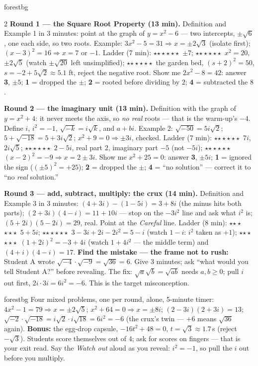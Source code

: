 \documentclass[10pt]{article}
\newcommand{\rung}[1]{{\color{goldacc}\ifcase#1\or$\star$\or$\star\star$\or$\star\star\star$\fi}}
\begin{document}
\begin{skillbox}{forestbg}
\begin{multicols}{2}
\textbf{Round 1 --- the Square Root Property (13 min).} Definition and Example 1 in 3 minutes:
point at the graph of $y=x^2-6$ --- two intercepts, $\pm\sqrt6$, one each side, so two roots.
Example: $3x^2-5=31\Rightarrow x=\pm2\sqrt3$ (isolate first); $(x-3)^2=16\Rightarrow x=7$ or
$-1$. Ladder (7 min): \rung1\ $\pm7$; \rung2\ $x^2=20$, $\pm2\sqrt5$ (watch $\pm\sqrt{20}$ left
unsimplified); \rung3\ the garden bed, $(s+2)^2=50$, $s=-2+5\sqrt2\approx5.1$ ft, reject the
negative root. Show me $2x^2-8=42$: answer \textbf{3}, $\pm5$; \textbf{1} = dropped the $\pm$;
\textbf{2} = rooted before dividing by $2$; \textbf{4} = subtracted the $8$.

\textbf{Round 2 --- the imaginary unit (13 min).} Definition with the graph of $y=x^2+4$:
it never meets the axis, so \emph{no real} roots --- that is the warm-up's $-4$. Define $i$,
$i^2=-1$, $\sqrt{-k}=i\sqrt k$, and $a+bi$. Example 2: $\sqrt{-50}=5i\sqrt2$;
$5+\sqrt{-18}=5+3i\sqrt2$; $x^2+9=0\Rightarrow\pm3i$, checked. Ladder (7 min): \rung1\ $7i$,
$2i\sqrt5$; \rung2\ $2-5i$, real part $2$, imaginary part $-5$ (not $-5i$); \rung3\
$(x-2)^2=-9\Rightarrow x=2\pm3i$. Show me $x^2+25=0$: answer \textbf{3}, $\pm5i$; \textbf{1} =
ignored the sign ($(\pm5)^2=+25$); \textbf{2} = dropped the $\pm$; \textbf{4} = ``no solution''
--- correct it to ``no \emph{real} solution.''

\columnbreak
\textbf{Round 3 --- add, subtract, multiply: the crux (14 min).} Definition and Example 3 in 3
minutes: $(4+3i)-(1-5i)=3+8i$ (the minus hits both parts); $(2+3i)(4-i)=11+10i$ --- stop on the
$-3i^2$ line and ask what $i^2$ is; $(5+2i)(5-2i)=29$, real. Point at the \emph{Careful} line.
Ladder (8 min): \rung1\ $5+5i$; \rung2\ $3-3i+2i-2i^2=5-i$ (watch $1-i$: $i^2$ taken as $+1$);
\rung3\ $(1+2i)^2=-3+4i$ (watch $1+4i^2$ --- the middle term) and $(4+i)(4-i)=17$.
\textbf{Find the mistake --- the frame not to rush:} Student A wrote
$\sqrt{-4}\cdot\sqrt{-9}=\sqrt{36}=6$. Give 3 minutes; ask ``what would you tell Student A?''
before revealing. The fix: $\sqrt a\sqrt b=\sqrt{ab}$ needs $a,b\ge0$; pull $i$ out first,
$2i\cdot3i=6i^2=-6$. This is the target misconception.
\end{multicols}
\end{skillbox}

\boxguard
\begin{skillbox}{forestbg}
Four mixed problems, one per round, alone, 5-minute timer: $4x^2-1=79\Rightarrow x=\pm2\sqrt5$;
$x^2+64=0\Rightarrow x=\pm8i$; $(2-3i)(2+3i)=13$; $\sqrt{-2}\cdot\sqrt{-18}=i\sqrt2\cdot
i\sqrt{18}=6i^2=-6$ (the crux's twin --- $+6$ means $\sqrt{36}$ again). \textbf{Bonus:} the
egg-drop capsule, $-16t^2+48=0$, $t=\sqrt3\approx1.7$\,s (reject $-\sqrt3$). Students score
themselves out of 4; ask for scores on fingers --- that is your exit read. Say the \emph{Watch
out} aloud as you reveal: $i^2=-1$, so pull the $i$ out before you multiply.
\end{skillbox}
\end{document}
